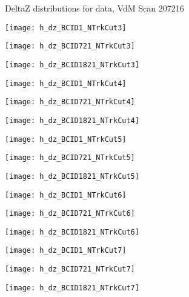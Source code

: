 \documentclass[8pt]{beamer}
\begin{document}
\begin{frame}
\centering
\large{DeltaZ distributions for data, VdM Scan 207216}
\end{frame}
\begin{frame}
\center
\texttt{[image: h\_dz\_BCID1\_NTrkCut3]}
\end{frame}
\begin{frame}
\center
\texttt{[image: h\_dz\_BCID721\_NTrkCut3]}
\end{frame}
\begin{frame}
\center
\texttt{[image: h\_dz\_BCID1821\_NTrkCut3]}
\end{frame}
\begin{frame}
\center
\texttt{[image: h\_dz\_BCID1\_NTrkCut4]}
\end{frame}
\begin{frame}
\center
\texttt{[image: h\_dz\_BCID721\_NTrkCut4]}
\end{frame}
\begin{frame}
\center
\texttt{[image: h\_dz\_BCID1821\_NTrkCut4]}
\end{frame}
\begin{frame}
\center
\texttt{[image: h\_dz\_BCID1\_NTrkCut5]}
\end{frame}
\begin{frame}
\center
\texttt{[image: h\_dz\_BCID721\_NTrkCut5]}
\end{frame}
\begin{frame}
\center
\texttt{[image: h\_dz\_BCID1821\_NTrkCut5]}
\end{frame}
\begin{frame}
\center
\texttt{[image: h\_dz\_BCID1\_NTrkCut6]}
\end{frame}
\begin{frame}
\center
\texttt{[image: h\_dz\_BCID721\_NTrkCut6]}
\end{frame}
\begin{frame}
\center
\texttt{[image: h\_dz\_BCID1821\_NTrkCut6]}
\end{frame}
\begin{frame}
\center
\texttt{[image: h\_dz\_BCID1\_NTrkCut7]}
\end{frame}
\begin{frame}
\center
\texttt{[image: h\_dz\_BCID721\_NTrkCut7]}
\end{frame}
\begin{frame}
\center
\texttt{[image: h\_dz\_BCID1821\_NTrkCut7]}
\end{frame}
\end{document}
